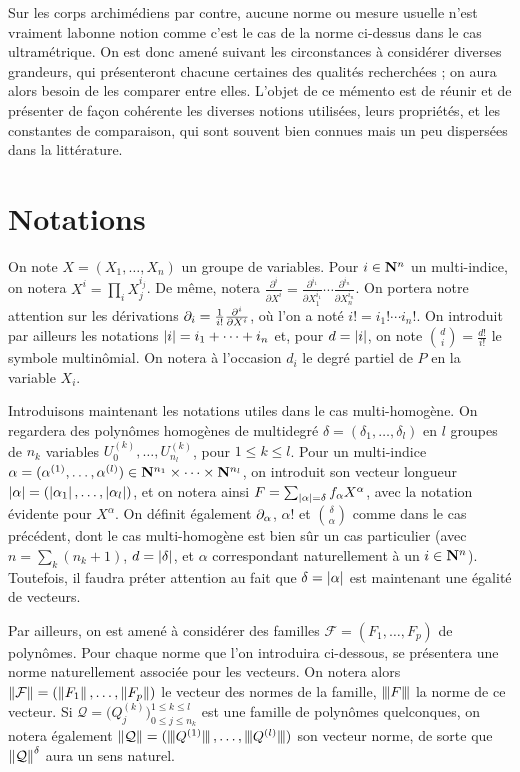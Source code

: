 Sur les corps archimédiens par contre, aucune norme ou mesure usuelle n'est
vraiment \og la\fg bonne notion comme c'est le cas de la norme ci-dessus dans
le cas ultramétrique. On est donc amené suivant les circonstances à considérer
diverses grandeurs, qui présenteront chacune certaines des qualités
recherchées ; on aura alors besoin de les comparer entre elles. L'objet de ce
mémento est de réunir et de présenter de façon cohérente les diverses notions
utilisées, leurs propriétés, et les constantes de comparaison, qui sont
souvent bien connues mais un peu dispersées dans la littérature.

\section{Notations}

On note $X = (X_1, \dots, X_n)$ un groupe de variables. Pour $i \in \mathbf{N}^n$ un
multi-indice, on notera $X^i = \prod_i X_j^{i_j}$. De même, notera
$\frac{\partial^i}{\partial X^i} = \frac{\partial^{i_1}}{\partial
  X_1^{i_1}}\cdots\frac{\partial^{i_n}}{\partial X_n^{i_n}}$. On portera notre
attention sur les dérivations $\partial_{i} = \frac1{i!}\frac{\partial^i}{\partial
  X^i}$, où l'on a noté $i! = i_1! \cdots i_n!$. On introduit par ailleurs les
notations $\left\lvert i\right\rvert = i_1 + \dots + i_n$ et, pour $d = \left\lvert i\right\rvert$, on note
$\binom{d}{i} = \frac{d!}{i!}$ le symbole multinômial. On notera à l'occasion
$d_i$ le degré partiel de $P$ en la variable $X_i$.

Introduisons maintenant les notations utiles dans le cas multi-homogène. On
regardera des polynômes homogènes de multidegré $\delta = (\delta_1, \dots,
\delta_l)$ en $l$ groupes de $n_k$ variables $U_0^{(k)}, \dots,
U_{n_l}^{(k)}$, pour $1\le k \le l$. Pour un multi-indice $\alpha =
(\alpha^{(1)}, \dots, \alpha^{(l)}) \in \mathbf{N}^{n_1} \times \dots \times
\mathbf{N}^{n_l}$, on introduit son vecteur longueur $\left\lvert\alpha\right\rvert =
(\left\lvert\alpha_1\right\rvert,\dots, \left\lvert\alpha_l\right\rvert)$, et on notera ainsi $F =
\sum_{\left\lvert\alpha\right\rvert = \delta} f_\alpha X^\alpha$, avec la notation évidente pour
$X^\alpha$. On définit également $\partial_{\alpha}$, $\alpha!$ et
$\binom{\delta}{\alpha}$ comme dans le cas précédent, dont le cas
multi-homogène est bien sûr un cas particulier (avec $n = \sum_k (n_k + 1)$,
$d = \left\lvert\delta\right\rvert$, et $\alpha$ correspondant naturellement à un $i \in \mathbf{N}^n$).
Toutefois, il faudra préter attention au fait que $\delta = \left\lvert\alpha\right\rvert$ est
maintenant une égalité de vecteurs.

Par ailleurs, on est amené à considérer des familles $\mathcal F = (F_1,
\dots, F_p)$ de polynômes. Pour chaque norme que l'on introduira ci-dessous,
se présentera une norme naturellement associée pour les vecteurs. On notera
alors $\left\lVert\mathcal F\right\rVert = (\left\lVert F_1\right\rVert, \ldots, \left\lVert F_p\right\rVert)$ le vecteur des
normes de la famille, $\left\lvert\hspace{-1pt}\left\lvert\hspace{-1pt} \left\lvert F\right\rvert \hspace{-1pt}\right\rvert\hspace{-1pt}\right\rvert$ la norme de ce vecteur. Si $\mathcal Q =
\big(Q_j^{(k)}\big)_{0 \le j \le n_k}^{1 \le k \le l}$ est une famille de
polynômes quelconques, on notera également $\left\lVert\mathcal Q\right\rVert =
(\left\lvert\hspace{-1pt}\left\lvert\hspace{-1pt} \left\lvert\smash{Q^{(1)}}\right\rvert \hspace{-1pt}\right\rvert\hspace{-1pt}\right\rvert, \ldots, \left\lvert\hspace{-1pt}\left\lvert\hspace{-1pt} \left\lvert\smash{Q^{(l)}}\right\rvert \hspace{-1pt}\right\rvert\hspace{-1pt}\right\rvert)$ son vecteur norme,
de sorte que $\left\lVert\mathcal Q\right\rVert ^\delta$ aura un sens naturel.

